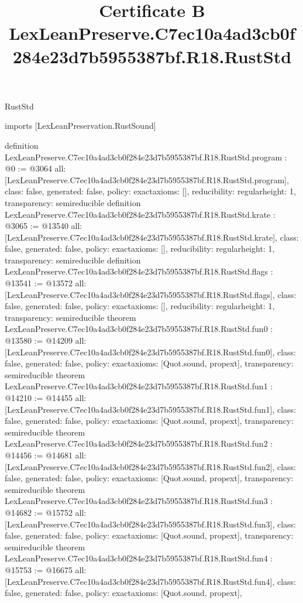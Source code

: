 \begin{lexlean}{RustStd}
\title{Certificate B LexLeanPreserve.C7ec10a4ad3cb0f284e23d7b5955387bf.R18.RustStd}
\begin{coremodule}
imports [LexLeanPreservation.RustSound]

definition LexLeanPreserve.C7ec10a4ad3cb0f284e23d7b5955387bf.R18.RustStd.program : @0 := @3064 {
  all: [LexLeanPreserve.C7ec10a4ad3cb0f284e23d7b5955387bf.R18.RustStd.program],
  class: false,
  generated: false,
  policy: exact{axioms: []},
  reducibility: regular{height: 1},
  transparency: semireducible
}
definition LexLeanPreserve.C7ec10a4ad3cb0f284e23d7b5955387bf.R18.RustStd.krate : @3065 := @13540 {
  all: [LexLeanPreserve.C7ec10a4ad3cb0f284e23d7b5955387bf.R18.RustStd.krate],
  class: false,
  generated: false,
  policy: exact{axioms: []},
  reducibility: regular{height: 1},
  transparency: semireducible
}
definition LexLeanPreserve.C7ec10a4ad3cb0f284e23d7b5955387bf.R18.RustStd.flags : @13541 := @13572 {
  all: [LexLeanPreserve.C7ec10a4ad3cb0f284e23d7b5955387bf.R18.RustStd.flags],
  class: false,
  generated: false,
  policy: exact{axioms: []},
  reducibility: regular{height: 1},
  transparency: semireducible
}
theorem LexLeanPreserve.C7ec10a4ad3cb0f284e23d7b5955387bf.R18.RustStd.fun0 : @13580 := @14209 {
  all: [LexLeanPreserve.C7ec10a4ad3cb0f284e23d7b5955387bf.R18.RustStd.fun0],
  class: false,
  generated: false,
  policy: exact{axioms: [Quot.sound, propext]},
  transparency: semireducible
}
theorem LexLeanPreserve.C7ec10a4ad3cb0f284e23d7b5955387bf.R18.RustStd.fun1 : @14210 := @14455 {
  all: [LexLeanPreserve.C7ec10a4ad3cb0f284e23d7b5955387bf.R18.RustStd.fun1],
  class: false,
  generated: false,
  policy: exact{axioms: [Quot.sound, propext]},
  transparency: semireducible
}
theorem LexLeanPreserve.C7ec10a4ad3cb0f284e23d7b5955387bf.R18.RustStd.fun2 : @14456 := @14681 {
  all: [LexLeanPreserve.C7ec10a4ad3cb0f284e23d7b5955387bf.R18.RustStd.fun2],
  class: false,
  generated: false,
  policy: exact{axioms: [Quot.sound, propext]},
  transparency: semireducible
}
theorem LexLeanPreserve.C7ec10a4ad3cb0f284e23d7b5955387bf.R18.RustStd.fun3 : @14682 := @15752 {
  all: [LexLeanPreserve.C7ec10a4ad3cb0f284e23d7b5955387bf.R18.RustStd.fun3],
  class: false,
  generated: false,
  policy: exact{axioms: [Quot.sound, propext]},
  transparency: semireducible
}
theorem LexLeanPreserve.C7ec10a4ad3cb0f284e23d7b5955387bf.R18.RustStd.fun4 : @15753 := @16675 {
  all: [LexLeanPreserve.C7ec10a4ad3cb0f284e23d7b5955387bf.R18.RustStd.fun4],
  class: false,
  generated: false,
  policy: exact{axioms: [Quot.sound, propext]},
}
\end{coremodule}
\end{lexlean}
